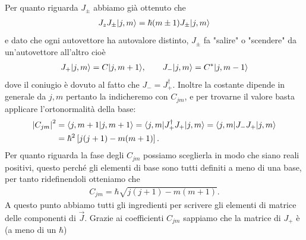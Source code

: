Per quanto riguarda $ J_\pm $ abbiamo già ottenuto che 
\begin{align*}
  J_z J_\pm \vert j, m \rangle = \hbar (m \pm 1) J_\pm \vert j, m \rangle
\end{align*}
e dato che ogni autovettore ha autovalore distinto, $ J_\pm $ fa "salire" o "scendere" da un'autovettore all'altro cioè
\begin{align*}
  J_+ \vert j, m \rangle = C \vert j, m + 1 \rangle, \qquad J_- \vert j, m \rangle = C^* \vert j, m - 1 \rangle
\end{align*}
dove il coniugio è dovuto al fatto che $ J_- = J_+^\dag $. Inoltre la costante dipende in generale da $ j,m $ pertanto la indicheremo con $ C_{jm} $, 
e per trovarne il valore basta applicare l'ortonormalità della base:
\begin{align*}
  \left|{C_{jm}}\right|^2 &= \langle j, m + 1 | j, m+1 \rangle = \langle j , m | J_+^\dag J_+ | j, m \rangle = \langle j , m | J_- J_+ | j, m \rangle 
  \\
  &= \hbar^2 \left[ j(j+1) - m(m+1) \right].
\end{align*}
Per quanto riguarda la fase degli $ C_{jm} $ possiamo sceglierla in modo che siano reali positivi, questo perché gli elementi di base sono tutti definiti 
a meno di una base, per tanto ridefinendoli otteniamo che 
\begin{align*}
  C_{jm} = \hbar \sqrt{j(j+1) - m(m+1)} .
\end{align*}
A questo punto abbiamo tutti gli ingredienti per scrivere gli elementi di matrice delle componenti di $ \vec{J} $. Grazie ai coefficienti $ C_{jm} $ 
sappiamo che la matrice di $ J_+ $ è (a meno di un $ \hbar $)
